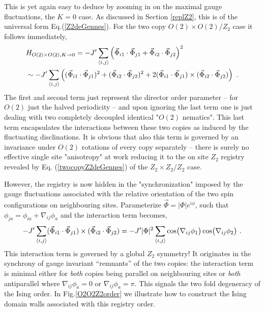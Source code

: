 This is yet again easy to deduce by zooming in on the maximal gauge fluctuations, the $K=0$ case. As discussed in Section \ref{replZ2}, this is of the universal form Eq.(\ref{Z2deGennes}). For the two copy $O(2) \times O(2)/Z_2$  case it follows immediately,
\begin{equation}
	\begin{split}
	&H_{O(2) \times O(2), K \rightarrow 0} =  -J' \sum_{\langle i, j \rangle} \left( \vec{\Phi}_{i1} \cdot  \vec{\Phi}_{j1} + \vec{\Phi}_{i2} \cdot  \vec{\Phi}_{j2} \right)^2 \\
		&\sim -J' \sum_{\langle i, j \rangle}  \left( ( \vec{\Phi}_{i1} \cdot  \vec{\Phi}_{j1})^2  + (\vec{\Phi}_{i2} \cdot  \vec{\Phi}_{j2})^2 +2 (  \vec{\Phi}_{i1} \cdot  \vec{\Phi}_{j1} ) \times ( \vec{\Phi}_{i2} \cdot  \vec{\Phi}_{j2}   ) \right) \ .
	\end{split} 
	\label{O2O2effH}
\end{equation}
The first and second term just represent the director order parameter -- for $O(2)$ just the halved periodicity -- and upon ignoring the last term one is just dealing with two completely decoupled identical "$O(2)$ nematics".  This last term encapsulates the interactions between these two copies as induced by the fluctuating disclinations. It is obvious that also this term is governed by an invariance under $O(2)$ rotations of every copy separately -- there is surely no effective single site "anisotropy" at work reducing  it to the on site  $Z_2$ registry revealed by Eq. (\ref{twocopyZ2deGennes}) of the $Z_2 \times Z_2 / Z_2$ case.

However, the registry is now hidden in the "synchronization" imposed by the gauge fluctuations associated with the relative orientation of the two spin configurations on neighbouring sites.  Parameterize $\vec{\Phi} = | \Phi | e^{i \phi}$, such that $\phi_{j a} = \phi_{i a} + \nabla_{ij} \phi_a$ and the interaction term becomes,
\begin{equation}
	-J' \sum_{\langle i, j \rangle} (  \vec{\Phi}_{i1} \cdot  \vec{\Phi}_{j1} ) \times ( \vec{\Phi}_{i2} \cdot  \vec{\Phi}_{j2}   ) =   -J' | \Phi |^2 \sum_{\langle i, j \rangle} \cos ( \nabla_{ij} \phi_1 ) \cos(  \nabla_{ij} \phi_2) \ .
	\label{O2O2dyn}
\end{equation}
This interaction term is governed by a global $Z_2$ symmetry! It originates in the synchrony of gauge invariant ``remnants'' of the two copies: the interaction term is minimal either for {\em both} copies being parallel on neighbouring sites  or {\em both} antiparallel where $\nabla_{ij} \phi_a=0$ or $\nabla_{ij} \phi_a=\pi$.  This signals the two fold degeneracy of the Ising order. In Fig.\ref{O2O2Z2order} we illustrate how to  construct the Ising domain walls associated with this registry order.  

